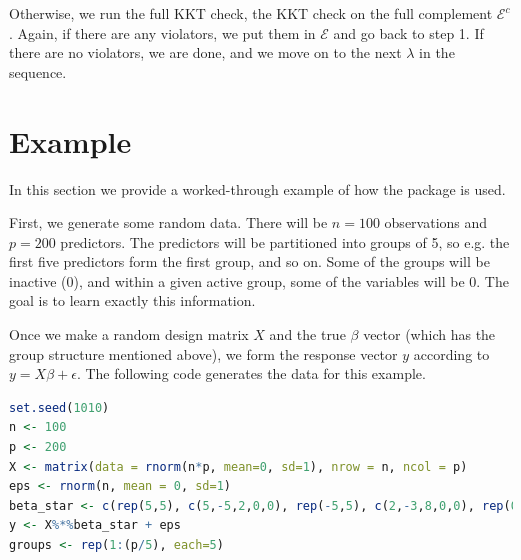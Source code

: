 \documentclass[titlepage]{article}
\begin{document}
Otherwise, we run the full KKT check, the KKT check on the full complement $\mathcal{E}^c$. Again, if there are any violators, we put them in $\mathcal{E}$ and go back to step 1. If there are no violators, we are done, and we move on to the next $\lambda$ in the sequence.



\section{Example}

In this section we provide a worked-through example of how the package is used. 

First, we generate some random data. There will be $n=100$ observations and $p=200$ predictors. The predictors will be partitioned into groups of 5, so e.g. the first five predictors form the first group, and so on. Some of the groups will be inactive ($0$), and within a given active group, some of the variables will be $0$. The goal is to learn exactly this information.

Once we make a random design matrix $X$ and the true $\beta$ vector (which has the group structure mentioned above), we form the response vector $y$ according to $y=X\beta + \epsilon$. The following code generates the data for this example.

\begin{lstlisting}[language=R]
set.seed(1010)
n <- 100
p <- 200
X <- matrix(data = rnorm(n*p, mean=0, sd=1), nrow = n, ncol = p)
eps <- rnorm(n, mean = 0, sd=1)
beta_star <- c(rep(5,5), c(5,-5,2,0,0), rep(-5,5), c(2,-3,8,0,0), rep(0,(p-20)))
y <- X%*%beta_star + eps
groups <- rep(1:(p/5), each=5)
\end{lstlisting}
\end{document}
